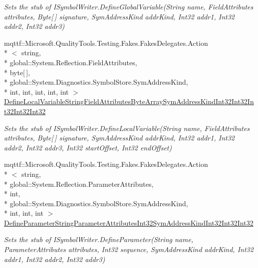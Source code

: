 \begin{DoxyCompactItemize}
\begin{DoxyCompactList}\small\item\em Sets the stub of I\-Symbol\-Writer.\-Define\-Global\-Variable(\-String name, Field\-Attributes attributes, Byte\mbox{[}$\,$\mbox{]} signature, Sym\-Address\-Kind addr\-Kind, Int32 addr1, Int32 addr2, Int32 addr3)\end{DoxyCompactList}\item 
mqttf\-::\-Microsoft.\-Quality\-Tools.\-Testing.\-Fakes.\-Fakes\-Delegates.\-Action\\*
$<$ string, \\*
global\-::\-System.\-Reflection.\-Field\-Attributes, \\*
byte\mbox{[}$\,$\mbox{]}, \\*
global\-::\-System.\-Diagnostics.\-Symbol\-Store.\-Sym\-Address\-Kind, \\*
int, int, int, int, int $>$ \hyperlink{class_system_1_1_diagnostics_1_1_symbol_store_1_1_fakes_1_1_stub_i_symbol_writer_a2f0e49009c97648aa763b4f4f65aa5b4}{Define\-Local\-Variable\-String\-Field\-Attributes\-Byte\-Array\-Sym\-Address\-Kind\-Int32\-Int32\-Int32\-Int32\-Int32}
\begin{DoxyCompactList}\small\item\em Sets the stub of I\-Symbol\-Writer.\-Define\-Local\-Variable(\-String name, Field\-Attributes attributes, Byte\mbox{[}$\,$\mbox{]} signature, Sym\-Address\-Kind addr\-Kind, Int32 addr1, Int32 addr2, Int32 addr3, Int32 start\-Offset, Int32 end\-Offset)\end{DoxyCompactList}\item 
mqttf\-::\-Microsoft.\-Quality\-Tools.\-Testing.\-Fakes.\-Fakes\-Delegates.\-Action\\*
$<$ string, \\*
global\-::\-System.\-Reflection.\-Parameter\-Attributes, \\*
int, \\*
global\-::\-System.\-Diagnostics.\-Symbol\-Store.\-Sym\-Address\-Kind, \\*
int, int, int $>$ \hyperlink{class_system_1_1_diagnostics_1_1_symbol_store_1_1_fakes_1_1_stub_i_symbol_writer_a4e3bf4e643901404bc5c2130282f10fa}{Define\-Parameter\-String\-Parameter\-Attributes\-Int32\-Sym\-Address\-Kind\-Int32\-Int32\-Int32}
\begin{DoxyCompactList}\small\item\em Sets the stub of I\-Symbol\-Writer.\-Define\-Parameter(\-String name, Parameter\-Attributes attributes, Int32 sequence, Sym\-Address\-Kind addr\-Kind, Int32 addr1, Int32 addr2, Int32 addr3)\end{DoxyCompactList}\item 

\end{DoxyCompactItemize}
